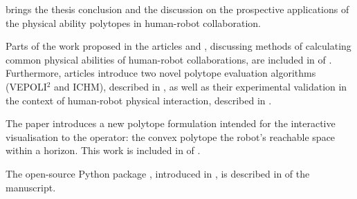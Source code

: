 
 brings the thesis conclusion and the discussion on the prospective applications of the physical ability polytopes in human-robot collaboration.


{

\newrefcontext[labelprefix=A]
\printbibliography[keyword={phd}, title=List of publications, heading=subbibnumbered, prenote=pubthesis]

Parts of the work proposed in the articles \cite{skuric2021robot} and  \cite{skuric2021common}, discussing methods of calculating common physical abilities of human-robot collaborations, are included in  of . Furthermore, articles \cite{skuric2021robot,Skuric2022human,skuric2023dynamics} introduce two novel polytope evaluation algorithms (VEPOLI$^2$ and ICHM), described in , as well as their experimental validation in the context of human-robot physical interaction, described in . 


The paper \cite{Skuric2022hfr} introduces a new polytope formulation intended for the interactive visualisation to the operator: the convex polytope the robot's reachable space within a horizon. This work is included in  of .


The open-source Python package , introduced in \cite{pycapacity}, is described in  of the manuscript.



}
{
\nocite{Zhen2020RWM, Skuric2022simplefoc}
\newrefcontext[labelprefix=B]
\printbibliography[keyword={phd_out}, title=Other publications during the thesis, heading=subbibliography, prenote=nopubthesis]



}

